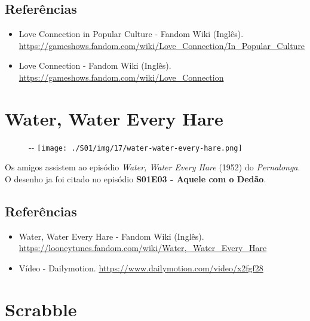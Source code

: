 \hypertarget{referuxeancias-2}{%
\subsection{Referências}\label{referuxeancias-2}}

\begin{itemize}
\tightlist
\item
  \sloppy Love Connection in Popular Culture - Fandom Wiki (Inglês). \url{https://gameshows.fandom.com/wiki/Love_Connection/In_Popular_Culture}
\item
  \sloppy Love Connection - Fandom Wiki (Inglês). \url{https://gameshows.fandom.com/wiki/Love_Connection}
\end{itemize}

\hypertarget{water-water-every-hare}{%
\section{Water, Water Every Hare}\label{water-water-every-hare}}

\begin{figure}[!ht]
  \begin{adjustwidth}{-\oddsidemargin-1in}{-\rightmargin}
    \centering
    \texttt{[image: ./S01/img/17/water-water-every-hare.png]}
  \end{adjustwidth}
\end{figure}

Os amigos assistem ao episódio \emph{Water, Water Every Hare} (1952) do
\emph{Pernalonga}. O desenho ja foi citado no episódio
\textbf{\textcolor{primarycolor}{S01E03 - Aquele com o Dedão}}.

\hypertarget{referuxeancias-3}{%
\subsection{Referências}\label{referuxeancias-3}}

\begin{itemize}
\tightlist
\item
  \sloppy Water, Water Every Hare - Fandom Wiki (Inglês). \url{https://looneytunes.fandom.com/wiki/Water,_Water_Every_Hare}
\item
  \sloppy Vídeo - Dailymotion. \url{https://www.dailymotion.com/video/x2fgf28}
\end{itemize}

\hypertarget{scrabble}{%
\section{Scrabble}\label{scrabble}}

